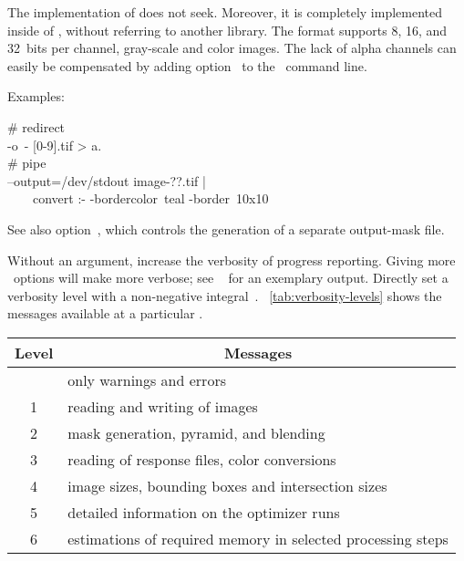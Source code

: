 \begin{codelist}
\begin{geeknote}
    The  implementation of
     does not seek.  Moreover, it is completely
    implemented inside of , without referring to another library.  The format
    supports 8, 16, and 32~bits per channel, gray-scale and color images.  The lack of alpha
    channels can easily be compensated by adding
    option~ to the \appcmd{}~command line.
  \end{geeknote}

  Examples:
  \begin{literal}
    \# redirect \\
    \app{} -o~- [0-9].tif > a. \\
    \# pipe \\
    \app{} --output=/dev/stdout image-??.tif | \bslash \\
    ~~~~convert :-
    -bordercolor~teal -border~10x10
  \end{literal}

  See also option~, which controls the
  generation of a separate output-mask file.


  \label{opt:verbose}%
\item[\itempar{-v \optional{\metavar{LEVEL}} \\ --verbose\optional{=\metavar{LEVEL}}}]\itemend
  Without an argument, increase the verbosity of progress reporting.  Giving more
  ~options will make \App{} more verbose; see
  \sectionName~ for an exemplary output.  Directly set a
  verbosity level with a non-negative integral~.
  \tableName~\ref{tab:verbosity-levels} shows the messages available at a particular
  .

  \begin{table}
    \centering
    \begin{tabular}{cp{.75\linewidth}}
      \hline
      \multicolumn{1}{c|}{Level} & \multicolumn{1}{c}{Messages} \\
      \hline\extraheadingsep
      0 & only warnings and errors \\
      1 & reading and writing of images \\
      2 & mask generation, pyramid, and blending \\
      3 & reading of response files, color conversions \\
      4 & image sizes, bounding boxes and intersection sizes \\
      5 & \restrictednote{\application{Enblend} only.} detailed
      information on the optimizer runs \\
      6 & estimations of required memory in selected processing steps \\
    \end{tabular}


\end{table}
\end{codelist}
